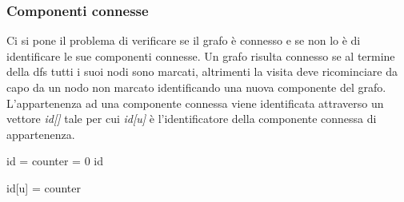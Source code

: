 \subsubsection{Componenti connesse}
Ci si pone il problema di verificare se il grafo \`e connesso e se non lo \`e di identificare le sue componenti connesse. Un grafo risulta connesso se al
termine della dfs tutti i suoi nodi sono marcati, altrimenti la visita deve ricominciare da capo da un nodo non marcato identificando una nuova componente
del grafo. L'appartenenza ad una componente connessa viene identificata attraverso un vettore \emph{id[]} tale per cui \emph{id[u]} \`e l'identificatore
della componente connessa di appartenenza.
\begin{multicols}{2}
\begin{algorithm}[H]
\DontPrintSemicolon
{}

\caption{\protect\Int[] \protect{}}

\Int[] id = \New \Int[G.\Size{}]\;
\Int counter = 0\;
\Return id\;
\end{algorithm}
\columnbreak
\begin{algorithm}[H]
\DontPrintSemicolon
{}

\caption{\protect\Int[] \protect{}}

id[u] = counter\;
\end{algorithm}
\end{multicols}
